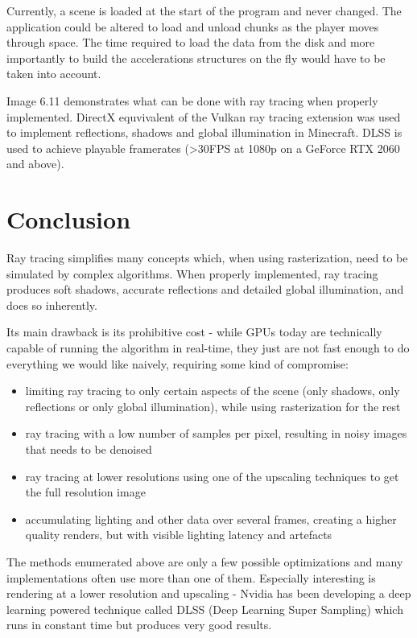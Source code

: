 \documentclass[times, utf8, zavrsni, numeric]{fer}
\begin{document}
Currently, a scene is loaded at the start of the program and never changed. The application could be altered to load and unload chunks as the player moves through space. The time required to load the data from the disk and more importantly to build the accelerations structures on the fly would have to be taken into account.

Image 6.11 demonstrates what can be done with ray tracing when properly implemented. DirectX equvivalent of the Vulkan ray tracing extension was used to implement reflections, shadows and global illumination in Minecraft. DLSS is used to achieve playable framerates (>30FPS at 1080p on a GeForce RTX 2060 and above).


\chapter{Conclusion}
Ray tracing simplifies many concepts which, when using rasterization, need to be simulated by complex algorithms. When properly implemented, ray tracing produces soft shadows, accurate reflections and detailed global illumination, and does so inherently.

Its main drawback is its prohibitive cost - while GPUs today are technically capable of running the algorithm in real-time, they just are not fast enough to do everything we would like naively, requiring some kind of compromise:
\begin{itemize}
	\item limiting ray tracing to only certain aspects of the scene (only shadows, only reflections or only global illumination), while using rasterization for the rest
	\item ray tracing with a low number of samples per pixel, resulting in noisy images that needs to be denoised
	\item ray tracing at lower resolutions using one of the upscaling techniques to get the full resolution image
	\item accumulating lighting and other data over several frames, creating a higher quality renders, but with visible lighting latency and artefacts
\end{itemize}

The methods enumerated above are only a few possible optimizations and many implementations often use more than one of them. Especially interesting is rendering at a lower resolution and upscaling - Nvidia has been developing a deep learning powered technique called DLSS (Deep Learning Super Sampling) which runs in constant time but produces very good results.
\end{document}

